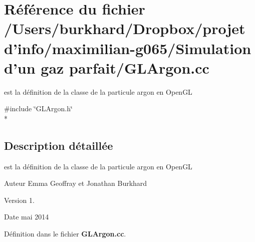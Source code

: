 \section{Référence du fichier /\+Users/burkhard/\+Dropbox/projet d'info/maximilian-\/g065/\+Simulation d'un gaz parfait/\+G\+L\+Argon.cc}
\label{_g_l_argon_8cc}


est la définition de la classe de la particule argon en Open\+G\+L  


{\ttfamily \#include \char`\"{}G\+L\+Argon.\+h\char`\"{}}\\*


\subsection{Description détaillée}
est la définition de la classe de la particule argon en Open\+G\+L 

\begin{DoxyAuthor}{Auteur}
Emma Geoffray et Jonathan Burkhard 
\end{DoxyAuthor}
\begin{DoxyVersion}{Version}
1. 
\end{DoxyVersion}
\begin{DoxyDate}{Date}
mai 2014 
\end{DoxyDate}


Définition dans le fichier {\bf G\+L\+Argon.\+cc}.

